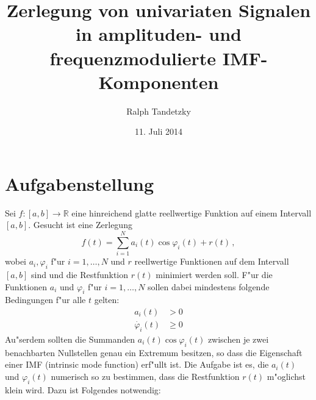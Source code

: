 \documentclass[a4paper]{scrartcl}
\newcommand{\R}{{\mathbb{R}}}
\newcommand{\pphi}{{\varphi}}
\begin{document}
\begin{titlepage}
  \title{Zerlegung von univariaten Signalen in amplituden- und frequenzmodulierte IMF-Komponenten}
  \author{Ralph Tandetzky}
  \date{11. Juli 2014}
  \maketitle
\end{titlepage}

\tableofcontents

\section{Aufgabenstellung}

Sei $f:[a,b]\to\R$ eine hinreichend glatte reellwertige Funktion auf einem Intervall $[a,b]$. 
Gesucht ist eine Zerlegung
$$ f(t) = \sum_{i=1}^N a_i(t)\cos\pphi_i(t) + r(t)\,, $$
wobei $a_i,\pphi_i$ f"ur $i=1,\dotsc,N$ und $r$ reellwertige Funktionen auf dem Intervall $[a,b]$ sind und die Restfunktion $r(t)$ minimiert werden soll. 
F"ur die Funktionen $a_i$ und $\pphi_i$ f"ur $i=1,\dotsc,N$ sollen dabei mindestens folgende Bedingungen f"ur alle $t$ gelten:
\begin{align*}
  a_i(t) &> 0 \\
  \dot{\pphi_i}(t) &\ge 0
\end{align*}
Au"serdem sollten die Summanden $a_i(t)\cos\pphi_i(t)$ zwischen je zwei benachbarten Nullstellen genau ein Extremum besitzen, so dass die Eigenschaft einer IMF (intrinsic mode function) erf"ullt ist. 
Die Aufgabe ist es, die $a_i(t)$ und $\pphi_i(t)$ numerisch so zu bestimmen, dass die Restfunktion $r(t)$ m"oglichst klein wird. 
Dazu ist Folgendes notwendig:
\end{document}
